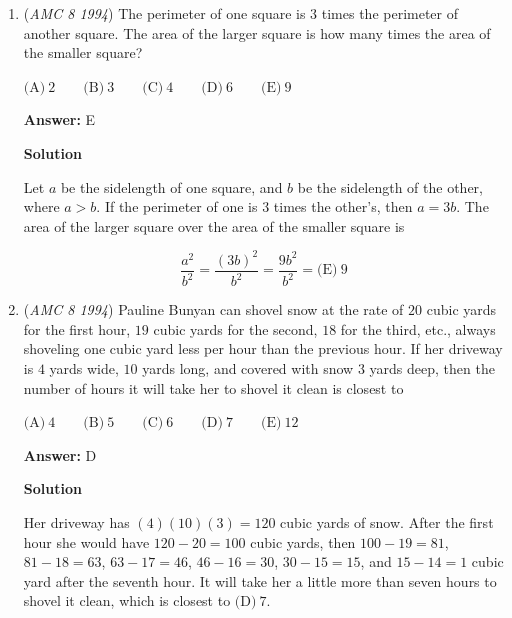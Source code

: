 \begin{enumerate}
Notice the pattern from $0$ to $4$ repeats for every four arrows. Any number that has a remainder of $0$ when divided by $4$ corresponds to $0$.

 The remainder when $425$ is divided by $4$ is $1$. The arrows from point $425$ to point $427$ correspond to points $1$ and $3$, which have the same pattern as $\boxed{\text{(A)}}$.

 


	\item (\textit{AMC 8 1994}) The perimeter of one square is $3$ times the perimeter of another square.  The area of the larger square is how many times the area of the smaller square?


 $\text{(A)}\ 2 \qquad \text{(B)}\ 3 \qquad \text{(C)}\ 4 \qquad \text{(D)}\ 6 \qquad \text{(E)}\ 9$

 \textbf{Answer: }E



\textbf{Solution}

Let $a$ be the sidelength of one square, and $b$ be the sidelength of the other, where $a>b$. If the perimeter of one is $3$ times the other's, then $a=3b$. The area of the larger square over the area of the smaller square is

 
 \[\frac{a^2}{b^2} = \frac{(3b)^2}{b^2} = \frac{9b^2}{b^2} = \boxed{\text{(E)}\ 9}\]



	\item (\textit{AMC 8 1994}) Pauline Bunyan can shovel snow at the rate of $20$ cubic yards for the first hour, $19$ cubic yards for the second, $18$ for the third, etc., always shoveling one cubic yard less per hour than the previous hour.  If her driveway is $4$ yards wide, $10$ yards long, and covered with snow $3$ yards deep, then the number of hours it will take her to shovel it clean is closest to


 $\text{(A)}\ 4 \qquad \text{(B)}\ 5 \qquad \text{(C)}\ 6 \qquad \text{(D)}\ 7 \qquad \text{(E)}\ 12$

 \textbf{Answer: }D



\textbf{Solution}

Her driveway has $(4)(10)(3)=120$ cubic yards of snow. After the first hour she would have $120-20=100$ cubic yards, then $100-19=81$, $81-18=63$, $63-17=46$, $46-16=30$, $30-15=15$, and $15-14=1$ cubic yard after the seventh hour. It will take her a little more than seven hours to shovel it clean, which is closest to $\boxed{\text{(D)}\ 7}$.


\end{enumerate}
